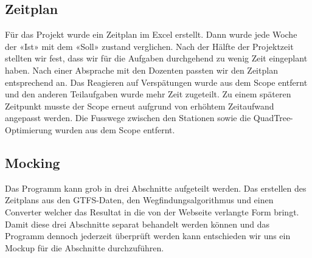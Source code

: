 \subsection{Zeitplan}
Für das Projekt wurde ein Zeitplan im Excel erstellt. Dann wurde jede Woche der «Ist» mit dem «Soll» zustand verglichen. Nach der Hälfte der Projektzeit stellten wir fest, dass wir für die Aufgaben durchgehend zu wenig Zeit eingeplant haben. Nach einer Absprache mit den Dozenten passten wir den Zeitplan entsprechend an. Das Reagieren auf Verspätungen wurde aus dem Scope entfernt und den anderen Teilaufgaben wurde mehr Zeit zugeteilt.
Zu einem späteren Zeitpunkt musste der Scope erneut aufgrund von erhöhtem Zeitaufwand angepasst werden. Die Fusswege zwischen den Stationen sowie die QuadTree-Optimierung wurden aus dem Scope entfernt.

\subsection{Mocking}
Das Programm kann grob in drei Abschnitte aufgeteilt werden. Das erstellen des Zeitplans aus den GTFS-Daten, den Wegfindungsalgorithmus und einen Converter welcher das Resultat in die von der Webseite verlangte Form bringt. Damit diese drei Abschnitte separat behandelt werden können und das Programm dennoch jederzeit überprüft werden kann entschieden wir uns ein Mockup für die Abschnitte durchzuführen.


